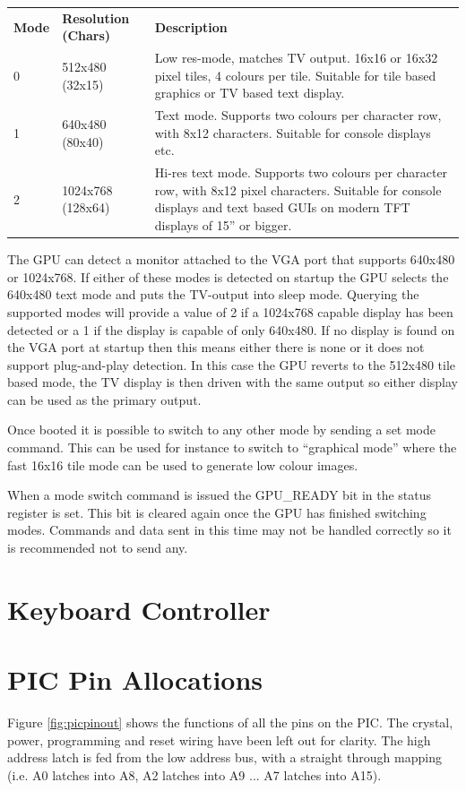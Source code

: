 \documentclass[a4paper,10pt]{book}
\begin{document}
\vspace{12pt}
\noindent
\begin{tabular}{llp{7cm}}
 \textbf{Mode}&\textbf{Resolution (Chars)}&\textbf{Description}\\
 0&512x480 (32x15)&Low res-mode, matches TV output.  16x16 or 16x32 pixel tiles,
 4 colours per tile.  Suitable for tile based graphics or TV based text
 display.\\
 1&640x480 (80x40)&Text mode.  Supports two colours per character row, with
 8x12 characters.  Suitable for console displays etc.\\
 2&1024x768 (128x64)&Hi-res text mode.  Supports two colours per character row,
 with 8x12 pixel characters.  Suitable for console displays and text based GUIs
 on modern TFT displays of 15'' or bigger.\\
\end{tabular}

The GPU can detect a monitor attached to the VGA port that supports 640x480 or
1024x768.  If either of these modes is detected on startup the GPU selects the
640x480 text mode and puts the TV-output into sleep mode.  Querying the
supported modes will provide a value of 2 if a 1024x768 capable display has been
detected or a 1 if the display is capable of only 640x480.  If no display is
found on the VGA port at startup then this means either there is none or it does
not support plug-and-play detection.  In this case the GPU reverts to the
512x480 tile based mode, the TV display is then driven with the same output so
either display can be used as the primary output.

Once booted it is possible to switch to any other mode by sending a set mode
command.  This can be used for instance to switch to ``graphical mode'' where
the fast 16x16 tile mode can be used to generate low colour images.

When a mode switch command is issued the GPU\_READY bit in the status register is
set.  This bit is cleared again once the GPU has finished switching modes.
Commands and data sent in this time may not be handled correctly so it is
recommended not to send any.

\chapter{Keyboard Controller}


\chapter{PIC Pin Allocations}
Figure \ref{fig:picpinout} shows the functions of all the pins on the PIC.  The crystal, power, programming and reset wiring have been left out for clarity.  The high address latch is fed from the low address bus, with a straight through mapping (i.e. A0 latches into A8, A2 latches into A9 ... A7 latches into A15).
\end{document}

